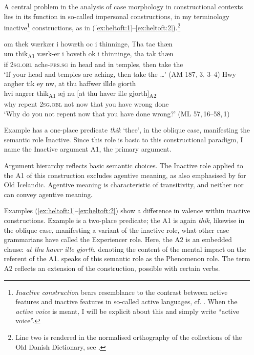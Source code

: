 \documentclass[output=paper]{langscibook}
\begin{document}
A central problem in the analysis of case morphology in constructional contexts lies in its function in so-called impersonal constructions, in my terminology inactive\footnote{\textit{Inactive construction} bears resemblance to the contrast between active features and inactive features in so-called active languages, cf. \citealt{Lehmann1989, Lehmann1993}. When the \textit{active voice} is meant, I will be explicit about this and simply write ``active voice''.} constructions, as in (\ref{ex:heltoft:1}--\ref{ex:heltoft:2}).\footnote{Line two is rendered in the normalised orthography of the collections of the Old Danish Dictionary, see .}

\ea \label{ex:heltoft:1} 
    \glll om thek wærkær i howæth oc i thinninge, Tha tac thæn \\
         um   thik\textsubscript{A1} værk-er     i hoveth ok i thinninge,     tha tak thæn \\
         if    2\textsc{sg.obl}   ache-\textsc{prs.sg}   in head and in temples,     then take the \\
    \glt `If your head and temples are aching, then take the …' (AM 187, 3, 3--4)
\ex \label{ex:heltoft:2} 
    \glll Hwy   angher tik ey nw, at thu haffwer illde giorth  \\
         hvi   angrer   thik\textsubscript{A1}     æj    nu     [at thu haver ille gjorth]\textsubscript{A2}\\
         why  repent  \textsc{2sg.obl}  not   now   that you have wrong done \\
    \glt `Why do you not repent now that you have done wrong?' (ML 57,\,16--58,\,1)
\z

Example  has a one-place predicate \textit{thik} `thee', in the oblique case, manifesting the semantic role Inactive. Since this role is basic to this constructional paradigm, I name the Inactive argument A1, the primary argument. 

Argument hierarchy reflects basic semantic choices. The Inactive role applied to the A1 of this construction excludes agentive meaning, as also emphasised by \citet{Faarlund2001, Faarlund2004} for Old Icelandic. Agentive meaning is characteristic of transitivity, and neither  nor  can convey agentive meaning. 

Examples (\ref{ex:heltoft:1}--\ref{ex:heltoft:2}) show a difference in valence within inactive constructions. Example  is a two-place predicate; the A1 is again \textit{thik}, likewise in the oblique case, manifesting a variant of the inactive role, what other case grammarians have called the Experiencer role. Here, the A2 is an embedded clause: \textit{at thu haver ille gjorth}, denoting the content of the mental impact on the referent of the A1. \citet{Halliday1994} speaks of this semantic role as the Phenomenon role. The term A2 reflects an extension of the construction, possible with certain verbs.
\end{document}

